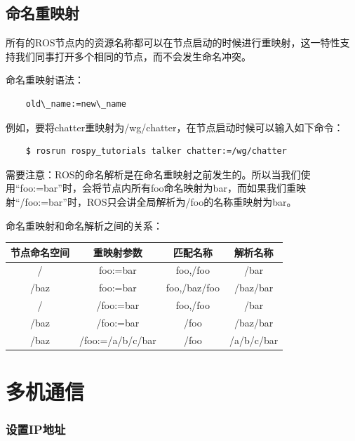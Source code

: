\documentclass[10pt, oneside]{book}
\begin{document}
\subsection{命名重映射}

所有的ROS节点内的资源名称都可以在节点启动的时候进行重映射，这一特性支持我们同事打开多个相同的节点，而不会发生命名冲突。

命名重映射语法：

\begin{verbatim}
    old\_name:=new\_name
\end{verbatim}

例如，要将chatter重映射为/wg/chatter，在节点启动时候可以输入如下命令：

\begin{verbatim}
    $ rosrun rospy_tutorials talker chatter:=/wg/chatter 
\end{verbatim}

需要注意：ROS的命名解析是在命名重映射之前发生的。所以当我们使用“foo:=bar”时，会将节点内所有foo命名映射为bar，而如果我们重映射“/foo:=bar”时，ROS只会讲全局解析为/foo的名称重映射为bar。

命名重映射和命名解析之间的关系：

\begin{table}[H]
    \centering
    \begin{tabular}{c|c|c|c}
    \hline
    节点命名空间 & 重映射参数            & 匹配名称         & 解析名称       \\ \hline
    /      & foo:=bar         & foo,/foo     & /bar       \\ \hline
    /baz   & foo:=bar         & foo,/baz/foo & /baz/bar   \\ \hline
    /      & /foo:=bar        & foo,/foo     & /bar       \\ \hline
    /baz   & /foo:=bar        & /foo         & /baz/bar   \\ \hline
    /baz   & /foo:=/a/b/c/bar & /foo         & /a/b/c/bar \\ \hline
    \end{tabular}
\end{table}

\section{多机通信}

\subsubsection{设置IP地址}
\end{document}
